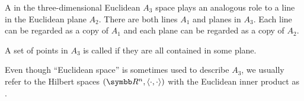 \begin{remark}
\begin{remenum}
     A  in the three-dimensional Euclidean \( A_3 \) space plays an analogous role to a line in the Euclidean plane \( A_2 \). There are both lines \( A_1 \) and planes in \( A_3 \). Each line can be regarded as a copy of \( A_1 \) and each plane can be regarded as a copy of \( A_2 \).

     A set of points in \( A_3 \) is called  if they are all contained in some plane.

     Even though \enquote{Euclidean space} is sometimes used to describe \( A_3 \), we usually refer to the Hilbert spaces \( (\R^n, \Prod \cdot \cdot) \) with the Euclidean inner product as .
  \end{remenum}
\end{remark}
